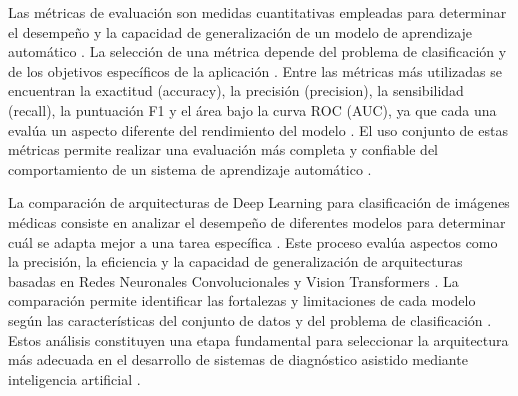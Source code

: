 Las métricas de evaluación son medidas cuantitativas empleadas para determinar el desempeño y la capacidad de generalización de un modelo de aprendizaje automático \cite{ref40}. La selección de una métrica depende del problema de clasificación y de los objetivos específicos de la aplicación \cite{ref40}. Entre las métricas más utilizadas se encuentran la exactitud (accuracy), la precisión (precision), la sensibilidad (recall), la puntuación F1 y el área bajo la curva ROC (AUC), ya que cada una evalúa un aspecto diferente del rendimiento del modelo \cite{ref40}. El uso conjunto de estas métricas permite realizar una evaluación más completa y confiable del comportamiento de un sistema de aprendizaje automático \cite{ref40}.

La comparación de arquitecturas de Deep Learning para clasificación de imágenes médicas consiste en analizar el desempeño de diferentes modelos para determinar cuál se adapta mejor a una tarea específica \cite{ref41}. Este proceso evalúa aspectos como la precisión, la eficiencia y la capacidad de generalización de arquitecturas basadas en Redes Neuronales Convolucionales y Vision Transformers \cite{ref41}. La comparación permite identificar las fortalezas y limitaciones de cada modelo según las características del conjunto de datos y del problema de clasificación \cite{ref41}. Estos análisis constituyen una etapa fundamental para seleccionar la arquitectura más adecuada en el desarrollo de sistemas de diagnóstico asistido mediante inteligencia artificial \cite{ref41}.